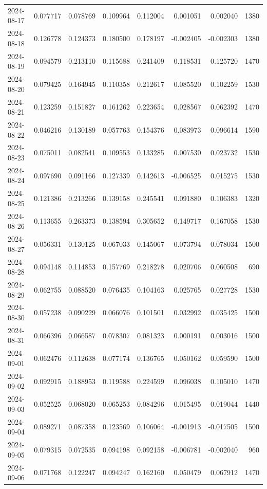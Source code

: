 \begin{tabular}{lrrrrrrr}
2024-08-17 & 0.077717 & 0.078769 & 0.109964 & 0.112004 & 0.001051 & 0.002040 & 1380 \\
2024-08-18 & 0.126778 & 0.124373 & 0.180500 & 0.178197 & -0.002405 & -0.002303 & 1380 \\
2024-08-19 & 0.094579 & 0.213110 & 0.115688 & 0.241409 & 0.118531 & 0.125720 & 1470 \\
2024-08-20 & 0.079425 & 0.164945 & 0.110358 & 0.212617 & 0.085520 & 0.102259 & 1530 \\
2024-08-21 & 0.123259 & 0.151827 & 0.161262 & 0.223654 & 0.028567 & 0.062392 & 1470 \\
2024-08-22 & 0.046216 & 0.130189 & 0.057763 & 0.154376 & 0.083973 & 0.096614 & 1590 \\
2024-08-23 & 0.075011 & 0.082541 & 0.109553 & 0.133285 & 0.007530 & 0.023732 & 1530 \\
2024-08-24 & 0.097690 & 0.091166 & 0.127339 & 0.142613 & -0.006525 & 0.015275 & 1530 \\
2024-08-25 & 0.121386 & 0.213266 & 0.139158 & 0.245541 & 0.091880 & 0.106383 & 1320 \\
2024-08-26 & 0.113655 & 0.263373 & 0.138594 & 0.305652 & 0.149717 & 0.167058 & 1530 \\
2024-08-27 & 0.056331 & 0.130125 & 0.067033 & 0.145067 & 0.073794 & 0.078034 & 1500 \\
2024-08-28 & 0.094148 & 0.114853 & 0.157769 & 0.218278 & 0.020706 & 0.060508 & 690 \\
2024-08-29 & 0.062755 & 0.088520 & 0.076435 & 0.104163 & 0.025765 & 0.027728 & 1530 \\
2024-08-30 & 0.057238 & 0.090229 & 0.066076 & 0.101501 & 0.032992 & 0.035425 & 1500 \\
2024-08-31 & 0.066396 & 0.066587 & 0.078307 & 0.081323 & 0.000191 & 0.003016 & 1500 \\
2024-09-01 & 0.062476 & 0.112638 & 0.077174 & 0.136765 & 0.050162 & 0.059590 & 1500 \\
2024-09-02 & 0.092915 & 0.188953 & 0.119588 & 0.224599 & 0.096038 & 0.105010 & 1470 \\
2024-09-03 & 0.052525 & 0.068020 & 0.065253 & 0.084296 & 0.015495 & 0.019044 & 1440 \\
2024-09-04 & 0.089271 & 0.087358 & 0.123569 & 0.106064 & -0.001913 & -0.017505 & 1500 \\
2024-09-05 & 0.079315 & 0.072535 & 0.094198 & 0.092158 & -0.006781 & -0.002040 & 960 \\
2024-09-06 & 0.071768 & 0.122247 & 0.094247 & 0.162160 & 0.050479 & 0.067912 & 1470 \\

\end{tabular}
